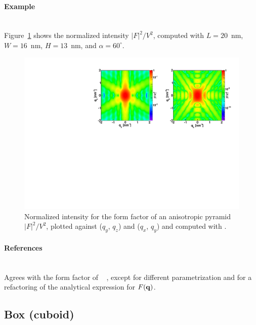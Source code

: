 \paragraph{Example}\strut\\
Figure~\ref{fig:FFAnisoPyramidEx} shows the normalized intensity
$|F|^2/V^2$, computed with $L=20$~nm, $W=16$~nm, $H=13$~nm, and
$\alpha=60^{\circ}$.

\begin{figure}[h]
\begin{center}
\includegraphics[angle=-90,width=\textwidth]{fig/ff/figffanisopyramid.pdf}
\end{center}
\caption{Normalized intensity for the form factor of an anisotropic
  pyramid $|F|^2/V^2$, plotted against ($q_y$, $q_z$) and  ($q_x$, $q_y$) and computed with .}
\label{fig:FFAnisoPyramidEx}
\end{figure}

\paragraph{References}\strut\\
Agrees with the  form factor of \IsGISAXS\
\cite[Eq.~2.40]{Laz08} \cite[Eq.~217]{ReLL09},
except for different parametrization and
for a refactoring of the analytical expression for $F(\mathbf{q})$.

\FloatBarrier\newpage
\subsection{Box (cuboid)} \label{sec:Box}

